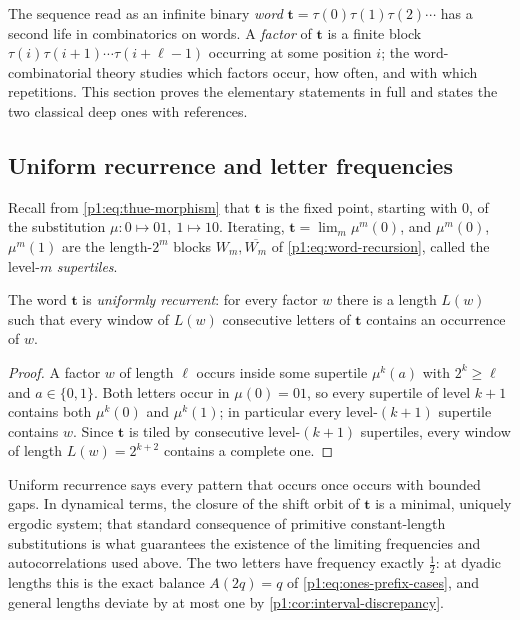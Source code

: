 \documentclass[11pt,oneside]{article}
\numberwithin{equation}{section}
\theoremstyle{definition}
\theoremstyle{remark}
\begin{document}
The sequence read as an infinite binary \emph{word}
\(\mathbf t=\tau(0)\tau(1)\tau(2)\cdots\) has a second life in combinatorics
on words.  A \emph{factor} of \(\mathbf t\) is a finite block
\(\tau(i)\tau(i+1)\cdots\tau(i+\ell-1)\) occurring at some position \(i\);
the word-combinatorial theory studies which factors occur, how often, and
with which repetitions.  This section proves the elementary statements in
full and states the two classical deep ones with references.

\subsection{Uniform recurrence and letter frequencies}

Recall from \eqref{p1:eq:thue-morphism} that \(\mathbf t\) is the fixed point,
starting with \(0\), of the substitution
\(\mu:0\mapsto01,\ 1\mapsto10\).  Iterating,
\(\mathbf t=\lim_m\mu^m(0)\), and \(\mu^m(0)\), \(\mu^m(1)\) are the
length-\(2^m\) blocks \(W_m,\overline{W_m}\) of
\eqref{p1:eq:word-recursion}, called the level-\(m\) \emph{supertiles}.

\begin{proposition}
\label{p1:prop:uniform-recurrence}
The word \(\mathbf t\) is \emph{uniformly recurrent}: for every factor
\(w\) there is a length \(L(w)\) such that every window of \(L(w)\)
consecutive letters of \(\mathbf t\) contains an occurrence of \(w\).
\end{proposition}

\begin{proof}
A factor \(w\) of length \(\ell\) occurs inside some supertile
\(\mu^k(a)\) with \(2^k\ge\ell\) and \(a\in\{0,1\}\).  Both letters occur
in \(\mu(0)=01\), so every supertile of level \(k+1\) contains both
\(\mu^k(0)\) and \(\mu^k(1)\); in particular every level-\((k+1)\)
supertile contains \(w\).  Since \(\mathbf t\) is tiled by consecutive
level-\((k+1)\) supertiles, every window of length \(L(w)=2^{k+2}\) contains
a complete one.
\end{proof}

Uniform recurrence says every pattern that occurs once occurs with bounded
gaps.  In dynamical terms, the closure of the shift orbit of
\(\mathbf t\) is a minimal, uniquely ergodic system; that standard
consequence of primitive constant-length substitutions
\cite{p1:queffelec2010} is what guarantees the existence of the limiting
frequencies and autocorrelations used above.  The two letters have
frequency exactly \(\tfrac12\): at dyadic lengths this is the exact balance
\(A(2q)=q\) of \eqref{p1:eq:ones-prefix-cases}, and general lengths deviate by
at most one by \cref{p1:cor:interval-discrepancy}.
\end{document}
